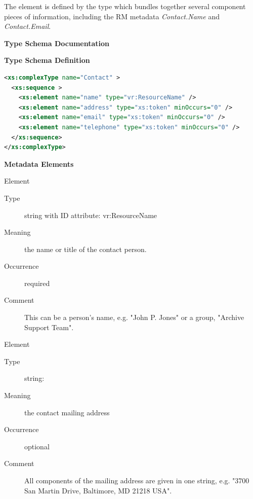 \documentclass[11pt,a4paper]{ivoa}
\begin{document}



The  element is defined by the
 type which bundles together several component
pieces of information, including the RM metadata \emph{Contact.Name}
and \emph{Contact.Email}.  



\begin{generated}
\begingroup
      	\renewcommand*\descriptionlabel[1]{%
      	\hbox to 5.5em{\emph{#1}\hfil}}\vspace{2ex}\noindent\textbf{ Type Schema Documentation}


\vspace{1ex}\noindent\textbf{ Type Schema Definition}

\begin{lstlisting}[language=XML,basicstyle=\footnotesize]
<xs:complexType name="Contact" >
  <xs:sequence >
    <xs:element name="name" type="vr:ResourceName" />
    <xs:element name="address" type="xs:token" minOccurs="0" />
    <xs:element name="email" type="xs:token" minOccurs="0" />
    <xs:element name="telephone" type="xs:token" minOccurs="0" />
  </xs:sequence>
</xs:complexType>
\end{lstlisting}

\vspace{0.5ex}\noindent\textbf{ Metadata Elements}

\begingroup\small\begin{bigdescription}\item[Element \xmlel{name}]
\begin{description}
\item[Type] string with ID attribute: vr:ResourceName
\item[Meaning] 
                  the name or title of the contact person.
              
\item[Occurrence] required
\item[Comment] 
                  This can be a person's name, e.g. {"}John P. Jones{"} or
                  a group, {"}Archive Support Team{"}.
              

\end{description}
\item[Element \xmlel{address}]
\begin{description}
\item[Type] string: 
\item[Meaning] the contact mailing address
\item[Occurrence] optional
\item[Comment] 
                All components of the mailing address are given in one
                string, e.g. {"}3700 San Martin Drive, Baltimore, MD 21218 USA{"}.
              


\end{description}
\end{bigdescription}
\end{generated}
\end{document}

